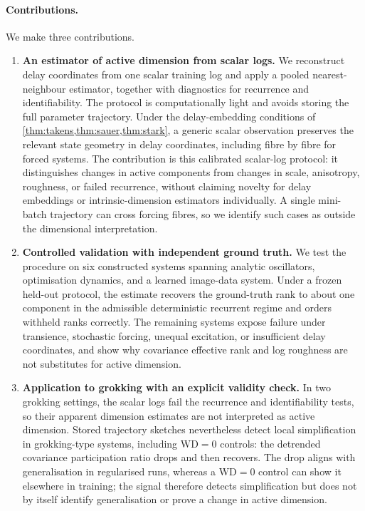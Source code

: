 \documentclass{article}
\newenvironment{claude}{\color{claudecolor}}{}
\begin{document}
\begin{claude}
\paragraph{Contributions.} We make three contributions.
\begin{enumerate}[leftmargin=1.2em, itemsep=2pt, topsep=3pt, parsep=0pt]
\item \textbf{An estimator of active dimension from scalar logs.} We reconstruct delay coordinates
from one scalar training log and apply a pooled nearest-neighbour estimator, together with diagnostics
for recurrence and identifiability. The protocol is computationally light and avoids storing the
full parameter trajectory. Under the delay-embedding conditions of
\cref{thm:takens,thm:sauer,thm:stark}, a generic scalar observation preserves the relevant state
geometry in delay coordinates, including fibre by fibre for forced systems. The contribution is this
calibrated scalar-log protocol: it distinguishes changes in active components from changes in scale,
anisotropy, roughness, or failed recurrence, without claiming novelty for delay embeddings or
intrinsic-dimension estimators individually. A single mini-batch trajectory can cross forcing fibres,
so we identify such cases as outside the dimensional interpretation.

\item \textbf{Controlled validation with independent ground truth.} We test the procedure on six
constructed systems spanning analytic oscillators, optimisation dynamics, and a learned image-data
system. Under a frozen held-out protocol, the estimate recovers the ground-truth rank to about one
component in the admissible deterministic recurrent regime and orders withheld ranks correctly. The
remaining systems expose failure under transience, stochastic forcing, unequal excitation, or
insufficient delay coordinates, and show why covariance effective rank and log roughness are not
substitutes for active dimension.

\item \textbf{Application to grokking with an explicit validity check.} In two grokking settings,
the scalar logs fail the recurrence and identifiability tests, so their apparent dimension estimates
are not interpreted as active dimension. Stored trajectory sketches nevertheless detect local
simplification in grokking-type systems, including $\mathrm{WD}=0$ controls: the detrended covariance
participation ratio drops and then recovers. The drop aligns with generalisation in regularised runs,
whereas a $\mathrm{WD}=0$ control can show it elsewhere in training; the signal therefore detects
simplification but does not by itself identify generalisation or prove a change in active dimension.
\end{enumerate}
\end{claude}
\end{document}
